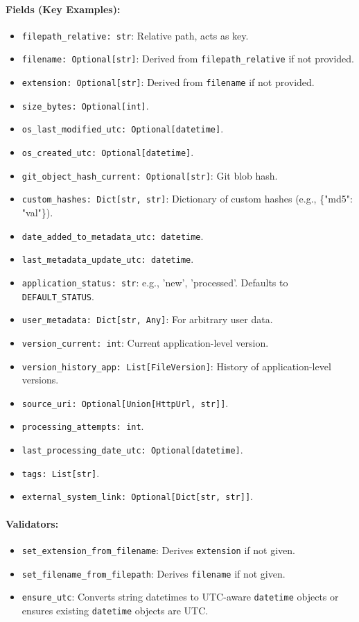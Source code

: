 \documentclass{article}
\begin{document}
\paragraph{Fields (Key Examples):}
\begin{itemize}
    \item \texttt{filepath\_relative: str}: Relative path, acts as key.
    \item \texttt{filename: Optional[str]}: Derived from \texttt{filepath\_relative} if not provided.
    \item \texttt{extension: Optional[str]}: Derived from \texttt{filename} if not provided.
    \item \texttt{size\_bytes: Optional[int]}.
    \item \texttt{os\_last\_modified\_utc: Optional[datetime]}.
    \item \texttt{os\_created\_utc: Optional[datetime]}.
    \item \texttt{git\_object\_hash\_current: Optional[str]}: Git blob hash.
    \item \texttt{custom\_hashes: Dict[str, str]}: Dictionary of custom hashes (e.g., \{"md5": "val"\}).
    \item \texttt{date\_added\_to\_metadata\_utc: datetime}.
    \item \texttt{last\_metadata\_update\_utc: datetime}.
    \item \texttt{application\_status: str}: e.g., 'new', 'processed'. Defaults to \texttt{DEFAULT\_STATUS}.
    \item \texttt{user\_metadata: Dict[str, Any]}: For arbitrary user data.
    \item \texttt{version\_current: int}: Current application-level version.
    \item \texttt{version\_history\_app: List[FileVersion]}: History of application-level versions.
    \item \texttt{source\_uri: Optional[Union[HttpUrl, str]]}.
    \item \texttt{processing\_attempts: int}.
    \item \texttt{last\_processing\_date\_utc: Optional[datetime]}.
    \item \texttt{tags: List[str]}.
    \item \texttt{external\_system\_link: Optional[Dict[str, str]]}.
\end{itemize}
\paragraph{Validators:}
\begin{itemize}
    \item \texttt{set\_extension\_from\_filename}: Derives \texttt{extension} if not given.
    \item \texttt{set\_filename\_from\_filepath}: Derives \texttt{filename} if not given.
    \item \texttt{ensure\_utc}: Converts string datetimes to UTC-aware \texttt{datetime} objects or ensures existing \texttt{datetime} objects are UTC.
\end{itemize}
\end{document}
